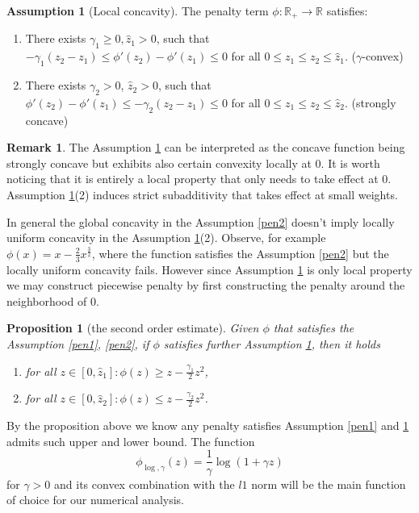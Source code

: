 \documentclass[12pt,fleqn]{amsart}
\newtheorem{proposition}[theorem]{Proposition}
\theoremstyle{definition}
\newtheorem{assumption}{Assumption}[section]
\newtheorem{remark}{Remark}
\begin{document}
\begin{assumption}[Local concavity]
 \label{pen3}
 The penalty term $\phi: \mathbb{R}_+ \rightarrow \mathbb{R}$ satisfies:
 \begin{enumerate}
  	\item There exists $\gamma_1 \ge 0, \hat{z}_1 > 0$, such that $  -\gamma_1(z_2 - z_1) \le \phi'(z_2) - \phi'(z_1) \le 0$ for all $0\le z_1 \le z_2 \le \hat{z}_1. $ ($\gamma$-convex)
 	\item There exists $\gamma_2 > 0$, $\hat{z}_2 > 0$, such that $\phi'(z_2) - \phi'(z_1) \le -\gamma_2(z_2 - z_1) \le 0 $ for all  $0 \le z_1 \le z_2 \le \hat{z}_2. $ (strongly concave)
 \end{enumerate}
 \end{assumption}
 \begin{remark}
 The Assumption \ref{pen3} can be interpreted as the concave function being strongly concave but exhibits also certain convexity locally at 0. It is worth noticing that it is entirely a local property that only needs to take effect at 0. Assumption \ref{pen3}(2) induces  strict subadditivity that takes effect at small weights. \par
 In general the global concavity in the Assumption \ref{pen2} doesn't imply locally uniform concavity in the Assumption \ref{pen3}(2). 
 Observe, for example $\phi(x) =  x - \frac{2}{3}x^{\frac{3}{2}}$, where the function satisfies the Assumption \ref{pen2} but the locally uniform concavity fails. However since Assumption \ref{pen3} is only local property we may construct piecewise penalty by first constructing the penalty around the neighborhood of 0. 
  
 \end{remark}

\begin{proposition}[the second order estimate]
\label{secondorderestimate}
	Given $\phi$ that satisfies the Assumption \ref{pen1}, \ref{pen2}, if $\phi$ satisfies further Assumption \ref{pen3}, then it holds
	\begin{enumerate}
		\item for all $ z \in [0, \hat{z}_1]: \phi(z) \ge z - \frac{\gamma_1}{2} z^2$, 
		\item for all $z \in [0, \hat{z}_2]: \phi(z) \le z - \frac{\gamma_2}{2}z^2$.
	\end{enumerate} 
\end{proposition}

By the proposition above we know any penalty satisfies Assumption \ref{pen1} and \ref{pen3} admits such upper and lower bound. 
The function
\begin{equation}
	\phi_{\log, \gamma}(z) = \frac{1}{\gamma} \log ( 1 + \gamma z)
\end{equation}
for $\gamma > 0$ and its convex combination with the $l1$ norm will be the main function of choice for our numerical analysis. 
\end{document}
